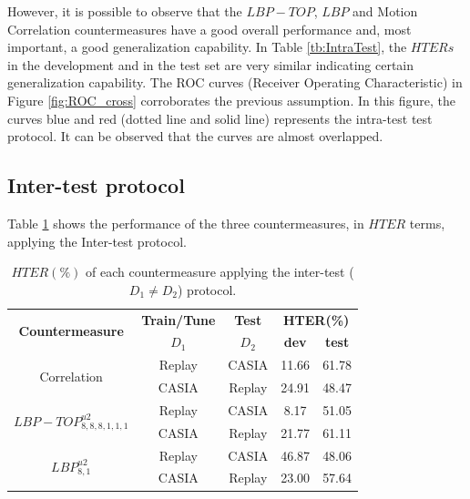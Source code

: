 However, it is possible to observe that the $LBP-TOP$, $LBP$ and Motion Correlation countermeasures have a good overall performance and, most important, a good generalization capability. In Table \ref{tb:IntraTest}, the $HTERs$ in the development and in the test set are very similar indicating certain generalization capability. The ROC curves (Receiver Operating Characteristic) in Figure \ref{fig:ROC_cross} corroborates the previous assumption. In this figure, the curves blue and red (dotted line and solid line) represents the intra-test test protocol. It can be observed that the curves are almost overlapped.

\subsection{Inter-test protocol}
\label{sec:Inter_test}

Table \ref{tb:InterTest} shows the performance of the three countermeasures, in $HTER$ terms, applying the Inter-test protocol.

\hspace{-17mm}\begin{table}[ht!]
\caption{$HTER(\%)$ of each countermeasure applying the inter-test ($D_1 \neq D_2$) protocol.}
\begin{center}
  \begin{tabular}{ | c | c | c | c  c | }
    \hline

   \multirow{2}{*}{\textbf{Countermeasure}} & \textbf{Train/Tune} & \textbf{Test} & \multicolumn{2}{c|}{\textbf{HTER(\%)}} \\ 
     & $D_1$ & $D_2$ & \textbf{dev} & \textbf{test}  \\ \hline
    
    \multirow{2}{*}{Correlation} &  Replay & CASIA & 11.66 & 61.78  \\ 
               & CASIA  & Replay & 24.91 & 48.47  \\ \hline \hline

    \multirow{2}{*}{$LBP-TOP_{8,8,8,1,1,1}^{u2}$}  &  Replay  & CASIA  & 8.17 & 51.05   \\
               & CASIA  & Replay & 21.77 & 61.11   \\ \hline \hline

    \multirow{2}{*}{$LBP_{8,1}^{u2}$} &  Replay  & CASIA  & 46.87  & 48.06   \\
               & CASIA  & Replay & 23.00 & 57.64  \\
            
    \hline
  \end{tabular}
\end{center}
\label{tb:InterTest}
\end{table}

